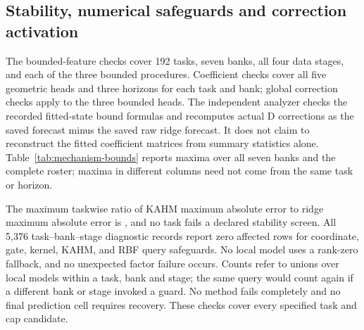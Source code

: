 \subsection{Stability, numerical safeguards and correction activation}

The bounded-feature checks cover 192 tasks, seven banks, all four data
stages, and each of the three bounded procedures. Coefficient checks cover
all five geometric heads and three horizons for each task and bank;
global correction checks apply to the three bounded heads. The
independent analyzer checks the recorded fitted-state bound formulas and
recomputes actual D corrections as the saved forecast minus the saved raw
ridge forecast. It does not claim to reconstruct the fitted coefficient
matrices from summary statistics alone. Table~\ref{tab:mechanism-bounds}
reports maxima over all seven banks and the complete roster; maxima in different columns need
not come from the same task or horizon.

\begin{table}[!htbp]
\centering\small
\setlength{\tabcolsep}{5pt}
\caption{Observed ratios to the deterministic bounded-feature and
ridge-readout limits. Feature ratios concern each procedure's complete
feature vector and its actual radius, including both blocks for the two
appended procedures.
A zero correction with a zero bound contributes ratio zero. ``Violations''
sums failed feature, coefficient and correction checks at the fixed numerical
tolerances. These are implementation checks, not confidence intervals for
forecast risk.}
\label{tab:mechanism-bounds}

\end{table}

The maximum taskwise ratio of KAHM maximum absolute error to ridge maximum
absolute error is \DFMaxErrorRatio{}, and no task fails a declared stability
screen. All 5,376 task--bank--stage diagnostic records report zero affected
rows for coordinate, gate, kernel, KAHM, and RBF query safeguards. No local
model uses a rank-zero fallback, and no unexpected factor failure occurs.
Counts refer to unions over local models within a task, bank and stage;
the same query would count again if a different bank or stage invoked a
guard. No method fails completely and no final prediction cell requires
recovery. These checks cover every specified task and cap candidate.

\begin{table}[!htbp]
\centering\small
\setlength{\tabcolsep}{4pt}
\caption{C-selected correction activation. Nonlinear and linear counts have
432 and 144 task/horizon cells, respectively. The four mixing-weight columns
combine all 576 cells. A policy choice of raw ridge is counted as zero
correction; raw ridge itself has no mixing selection. Nonzero mixing is not
an empirical guarantee of D improvement, and no minimum activation frequency
was part of the decision.}
\label{tab:mechanism-activation}

\end{table}

